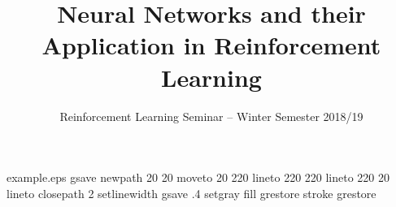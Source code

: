 %
%
%
%
%
\begin{filecontents*}{example.eps}
    gsave
    newpath
    20 20 moveto
    20 220 lineto
    220 220 lineto
    220 20 lineto
    closepath
    2 setlinewidth
    gsave
    .4 setgray fill
    grestore
    stroke
    grestore
\end{filecontents*}
%
\RequirePackage{fix-cm}
%
\documentclass[twocolumn]{svjour3}          %
%
\smartqed  %
%
\usepackage{graphicx}
\usepackage{amssymb}
\usepackage{amsmath}
%
%
%
%
%

\newcommand{\argmax}[1]{\underset{#1}{\operatorname{arg}\,\operatorname{max}}\;}



    \title{Neural Networks and their Application in Reinforcement Learning%
    }
    \subtitle{Reinforcement Learning Seminar -- Winter Semester 2018/19}


